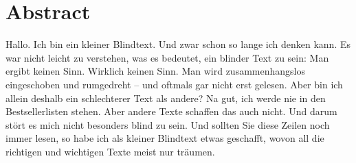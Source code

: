 \chapter*{Abstract}
\label{ch:abstract}
Hallo. Ich bin ein kleiner Blindtext. Und zwar schon so lange ich denken kann. Es war nicht leicht zu verstehen, was es bedeutet, ein blinder Text zu sein: Man ergibt keinen Sinn. Wirklich keinen Sinn. Man wird zusammenhangslos eingeschoben und rumgedreht – und oftmals gar nicht erst gelesen. Aber bin ich allein deshalb ein schlechterer Text als andere? Na gut, ich werde nie in den Bestsellerlisten stehen. Aber andere Texte schaffen das auch nicht. Und darum stört es mich nicht besonders blind zu sein. Und sollten Sie diese Zeilen noch immer lesen, so habe ich als kleiner Blindtext etwas geschafft, wovon all die richtigen und wichtigen Texte meist nur träumen.
